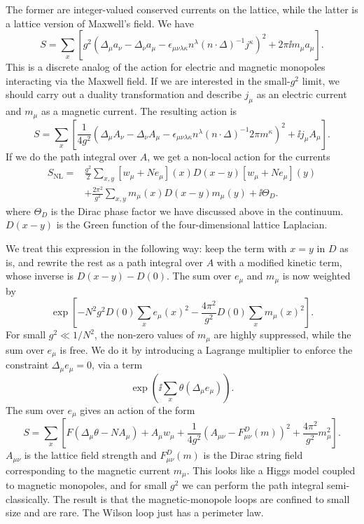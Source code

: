 The former are integer-valued conserved currents on the lattice, while the
latter is a lattice version of Maxwell's field. We have
\begin{equation*}
  S=\sum_x\left[g^2\left(\Delta_\mu a_\nu-\Delta_\nu a_\mu
  -\epsilon_{\mu\nu\lambda\kappa}n^\lambda(n\cdot\Delta)^{-1}j^\kappa\right)^2
  +2\pi\ii m_\mu a_\mu\right].
\end{equation*}
This is a discrete analog of the action for electric and magnetic monopoles
interacting via the Maxwell field. If we are interested in the small-$g^2$
limit, we should carry out a duality transformation and describe $j_\mu$ as an
electric current and $m_\mu$ as a magnetic current. The resulting action is
\begin{equation*}
  S=\sum_x\left[\frac{1}{4g^2}
  \left(\Delta_\mu A_\nu-\Delta_\nu A_\mu
  -\epsilon_{\mu\nu\lambda\kappa}n^\lambda(n\cdot\Delta)^{-1}2\pi m^\kappa\right)^2
  +\ii j_\mu A_\mu\right].
\end{equation*}
If we do the path integral over $A$, we get a non-local action for the currents
\begin{equation*}
\begin{split}
  S_{\mathrm{NL}}={}&\frac{g^2}{2}\sum_{x,y}[w_\mu+Ne_\mu](x)D(x-y)
  [w_\mu+Ne_\mu](y)\\
  &+\frac{2\pi^2}{g^2}\sum_{x,y}m_\mu(x)D(x-y)m_\mu(y)+\ii\Theta_D.
\end{split}
\end{equation*}
where $\Theta_D$ is the Dirac phase factor we have discussed above in the
continuum. $D(x-y)$ is the Green function of the four-dimensional lattice
Laplacian.

We treat this expression in the following way: keep the term with $x=y$ in
$D$ as is, and rewrite the rest as a path integral over $A$ with a modified
kinetic term, whose inverse is $D(x-y)-D(0)$. The sum over $e_\mu$ and $m_\mu$
is now weighted by
\begin{equation*}
  \exp\!\left[-N^2g^2D(0)\sum_xe_\mu(x)^2
  -\frac{4\pi^2}{g^2}D(0)\sum_xm_\mu(x)^2\right].
\end{equation*}
For small $g^2\ll1/N^2$, the non-zero values of $m_\mu$ are highly suppressed,
while the sum over $e_\mu$ is free. We do it by introducing a Lagrange
multiplier to enforce the constraint $\Delta_\mu e_\mu=0$, via a term
\begin{equation*}
  \exp\!\left(\ii\sum_x\theta(\Delta_\mu e_\mu)\right).
\end{equation*}
The sum over $e_\mu$ gives an action of the form
\begin{equation*}
  S=\sum_x\left[F(\Delta_\mu\theta-NA_\mu)+A_\mu w_\mu
  +\frac{1}{4g^2}\left(A_{\mu\nu}-F^D_{\mu\nu}(m)\right)^2
  +\frac{4\pi^2}{g^2}m_\mu^2\right].
\end{equation*}
$A_{\mu\nu}$ is the lattice field strength and $F^D_{\mu\nu}(m)$ is the Dirac
string field corresponding to the magnetic current $m_\mu$. This looks like a
Higgs model coupled to magnetic monopoles, and for small $g^2$ we can perform
the path integral semi-classically. The result is that the magnetic-monopole
loops are confined to small size and are rare. The Wilson loop just has a
perimeter law.

